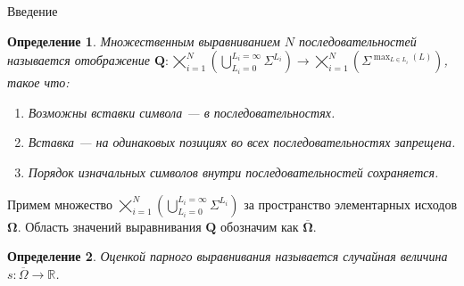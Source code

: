 \documentclass[ucs, notheorems, handout, 10pt]{beamer}
\newtheorem{defenition}{Определение}
\begin{document}
	\setcounter{framenumber}{3}
	\begin{frame}{Введение}					
		\begin{defenition}
			Множественным выравниванием $N$ последовательностей называется отображение $\textbf{Q}: \bigtimes_{i=1}^{N}(\bigcup_{L_i=0}^{L_i=\infty} \Sigma^{L_i}) \rightarrow \bigtimes_{i=1}^{N}(\Sigma^{\max_{L \in L_i}(L)})$, такое что:
			\begin{enumerate}
				\item Возможны вставки символа --- в последовательностях.
				\item Вставка --- на одинаковых позициях во всех последовательностях запрещена.
				\item Порядок изначальных символов внутри последовательностей сохраняется.
			\end{enumerate}
		\end{defenition}
		
		Примем множество $\bigtimes_{i=1}^{N}(\bigcup_{L_i=0}^{L_i=\infty} \Sigma^{L_i})$ за пространство элементарных исходов $\boldsymbol{\Omega}$. Область значений выравнивания $\textbf{Q}$ обозначим как $\overline {\boldsymbol{\Omega}}$.
		
		\begin{defenition}				
			Оценкой парного выравнивания называется случайная величина $s:\overline \Omega \rightarrow \mathbb{R}$.
		\end{defenition}	
		
	\end{frame}
	
\end{document}
